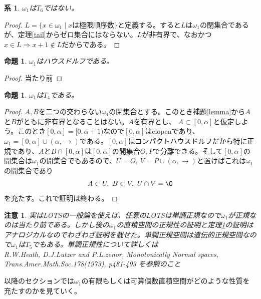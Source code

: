 \documentclass[leqno]{jsarticle}
\newtheorem{prop}[thm]{命題}
\newtheorem{cor}[thm]{系}
\newtheorem*{cau}{注意}
\newcommand{\To}{\Longrightarrow}
\newcommand{\al}{\alpha}
\begin{document}
\begin{cor}
$\omega_1$は$T_6$ではない。
\end{cor}
\begin{proof}
$L=\{x\in \omega_1\mid \text{$x$は極限順序数}\}$と定義する。すると$L$は$\omega_1$の閉集合であるが、定理\ref{tail}からゼロ集合にはならない。$L$が非有界で、なおかつ$x\in L\To x+1\not\in L$だからである。
\end{proof}

\begin{prop}
$\omega_1$はハウスドルフである。
\end{prop}
\begin{proof}
当たり前
\end{proof}

\begin{prop}\label{seiki}
$\omega_1$は$T_4$である。
\end{prop}
\begin{proof}
$A,B$を二つの交わらない$\omega_1$の閉集合とする。このとき補題\ref{lemma}から$A$と$B$がともに非有界となることはない。$A$を有界とし、
$A\subset [0,\al]$と仮定しよう。このとき$[0,\al]=[0,\al+1)$なので$[0,\al]$はclopenであり、$\omega_1=[0,\al]\cup(\al,\to)$である。$[0,\al]$はコンパクトハウスドルフだから特に正規であり、$A$と$B\cap[0,\al]$は$[0,\al]$の開集合$O,P$で分離できる。そして$[0,\al]$の開集合は$\omega_1$の開集合でもあるので、$U=O,\ V=P\cup(\al,\to)$と置けばこれは$\omega_1$の開集合であり
\[
A\subset U,\ B\subset V,\ U\cap V=\O
\]
を充たす。これで証明は終わる。
\end{proof}
\begin{cau}\normalfont
実はLOTSの一般論を使えば、任意のLOTSは単調正規なので$\omega_1$が正規なのは当たり前である。しかし後の$\omega_1$の直積空間の正規性の証明と定理\ref{seiki}の証明はアナロジカルなのでわざわざ証明を載せた。単調正規空間は遺伝的正規空間なので$\omega_1$は$T_5$でもある。単調正規性について詳しくは\\
 R.W.Heath, D.J.Lutzer and P.L.zenor, \textit{Monotonically Normal spaces}, Trans.Amer.Math.Soc.178(1973), p481-493
を参照のこと
\end{cau}

以降のセクションでは$\omega_1$の有限もしくは可算個数直積空間がどのような性質を充たすのかを見ていく。
\end{document}
